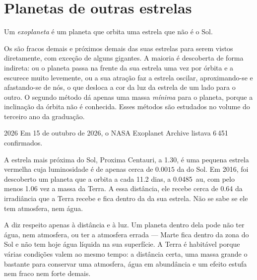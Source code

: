 \section{Planetas de outras estrelas}

\begin{definition}[Exoplaneta]\label{def:g10:habitable-planet:exoplanet}
Um \emph{exoplaneta} é um planeta que orbita uma estrela
que não é o Sol.
\end{definition}

Os  são fracos demais e próximos demais das suas estrelas para
serem vistos diretamente, com exceção de alguns gigantes. A maioria é
descoberta de forma indireta: ou o planeta passa na frente da sua estrela
uma vez por órbita e a escurece muito levemente, ou a sua atração faz a
estrela oscilar, aproximando-se e afastando-se de nós, o que desloca a cor
da luz da estrela de um lado para o outro. O segundo método dá apenas uma
massa \emph{mínima} para o planeta, porque a inclinação da órbita não é
conhecida. Esses métodos são estudados no volume do terceiro ano da
graduação.

\begin{dated}{2026}
Em 15 de outubro de 2026, o NASA Exoplanet Archive listava 6\,451
 confirmados.
\end{dated}

\begin{example}[Proxima b]\label{ex:g10:habitable-planet:proxima}
A estrela mais próxima do Sol, Proxima Centauri, a \qty{1.30}{\parsec},
é uma pequena estrela vermelha cuja luminosidade é de apenas cerca de
$0.0015$ da do Sol. Em 2016, foi descoberto um planeta que a orbita a cada
11.2 dias, a \qty{0.0485}{au}, com pelo menos 1.06 vez a massa da Terra. A
essa distância, ele recebe cerca de 0.64 da irradiância que a Terra recebe
e fica dentro da  da sua estrela. Não se sabe se ele tem
atmosfera, nem água.
\end{example}

\begin{remark}\label{rem:g10:habitable-planet:inhabited}
A  diz respeito apenas à distância e à luz. Um planeta dentro
dela pode não ter água, nem atmosfera, ou ter a atmosfera errada --- Marte
fica dentro da zona do Sol e não tem hoje água líquida na sua superfície. A
Terra é habitável porque várias condições valem ao mesmo tempo: a distância
certa, uma massa grande o bastante para conservar uma atmosfera, água em
abundância e um efeito estufa nem fraco nem forte demais.
\end{remark}

